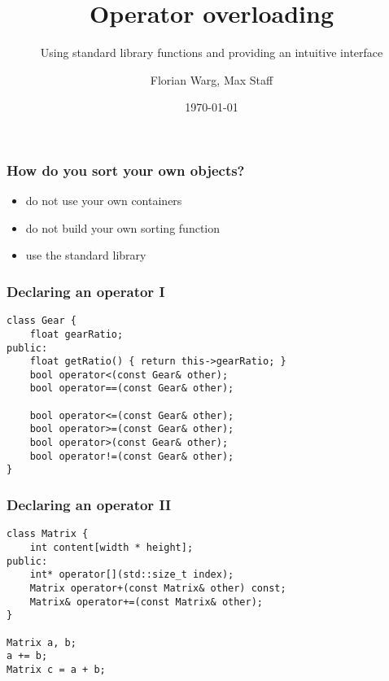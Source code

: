 
\usepackage{colortbl}



\title{Operator overloading}
\subtitle{Using standard library functions and providing an intuitive interface}
\date{\today}
\author{Florian Warg, Max Staff}

\maketitle

\begin{frame}[fragile]
    \frametitle{How do you sort your own objects?}
    \begin{itemize}
    \item do not use your own containers
    \item do not build your own sorting function
    \item use the standard library
    \end{itemize}
\end{frame}

\begin{frame}[fragile]
    \frametitle{Declaring an operator I}
    \begin{lstlisting}[numbers=none]
class Gear {
    float gearRatio;
public:
    float getRatio() { return this->gearRatio; }
    bool operator<(const Gear& other);
    bool operator==(const Gear& other);

    bool operator<=(const Gear& other);
    bool operator>=(const Gear& other);
    bool operator>(const Gear& other);
    bool operator!=(const Gear& other);
}
    \end{lstlisting}
\end{frame}

\begin{frame}[fragile]
    \frametitle{Declaring an operator II}
    \begin{lstlisting}[numbers=none]
class Matrix {
    int content[width * height];
public:
    int* operator[](std::size_t index);
    Matrix operator+(const Matrix& other) const;
    Matrix& operator+=(const Matrix& other);
}

Matrix a, b;
a += b;
Matrix c = a + b;
    \end{lstlisting}
\end{frame}

